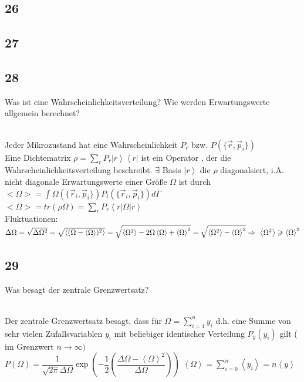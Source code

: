\documentclass[12pt,a4paper]{report}
\newenvironment{myfrag}{\begin{it}}{\end{it}\vspace{3mm}\par}
\numberwithin{equation}{section}
\begin{document}
\subsection{26}
\begin{myfrag}
\end{myfrag}
\subsection{27}
\begin{myfrag}

\end{myfrag}
\subsection{28}
\begin{myfrag}
Was ist eine Wahrscheinlichkeitsverteilung? Wie werden Erwartungswerte
allgemein berechnet?
\end{myfrag} \quad \\
Jeder Mikrozustand hat eine Wahrscheinlichkeit $P_r$ bzw. $P(\{ \vec{r},\vec{p} _i \} )$ \\ Eine Dichtematrix $\rho = \sum_r P_r \left|r\right\rangle \left\langle r \right| $ ist ein Operator , der die Wahrscheinlichkeitsverteilung beschreibt. $\exists$ Basis $\left| r \right\rangle$ die $\rho $ diagonalsiert, i.A. nicht diagonale Erwartungswerte einer Größe $\Omega $ ist durch \\[1ex]
$<\Omega > = \int \Omega ( \{ \vec{r} _i , \vec{p} _i \}) P_i(\{ \vec{r} _i , \vec{p} _i \} ) d\Gamma $\\[1ex]
$<\Omega> = tr(\rho \Omega )= \sum _ r P_r \left\langle r \right| \Omega \left| r \right\rangle $ \\
Fluktuationen: \\[1ex]
$\Delta \Omega = \sqrt{\Delta \Omega ^2} = \sqrt{\left\langle (\Omega - \left\langle \Omega \right\rangle ) ^2 \right\rangle} = \sqrt{\left\langle \Omega ^2 \right\rangle - 2 \Omega \left\langle \Omega \right\rangle  + \left\langle \Omega \right\rangle ^2} = \sqrt{\left\langle \Omega ^2 \right\rangle - \left\langle \Omega \right\rangle ^2} \\ \Rightarrow \ \left\langle \Omega ^2 \right\rangle \geqslant  \left\langle \Omega \right\rangle ^2 $
\subsection{29}
\begin{myfrag}
Was besagt der zentrale Grenzwertsatz?
\end{myfrag} \quad \\
Der zentrale Grenzwertsatz besagt, dass für $ \Omega = \sum \limits_{i=1}^n y_i $ d.h. eine Summe von sehr vielen Zufallsvariablen $y_i$ mit beliebiger identischer Verteilung $P_y(y_i)$ gilt ( im Grenzwert $ n \rightarrow \infty) $ \\[1ex]
$ P (\Omega ) = \dfrac{1}{\sqrt{2 \pi}\Delta \Omega } \exp\left(- \dfrac{1}{2} \left( \dfrac{\Delta \Omega - \left\langle \Omega \right\rangle ^2}{\Delta \Omega} \right) \right)$  \qquad $ \left\langle \Omega \right\rangle  = \sum \limits_{i=0}^n \left\langle y_i \right\rangle = n \left\langle y \right\rangle $
\end{document}
